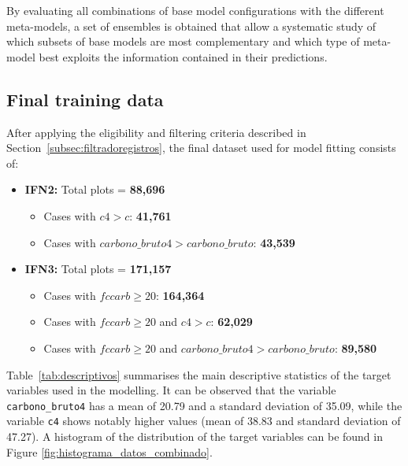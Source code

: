 By evaluating all combinations of base model configurations with the different meta-models, a set of ensembles is obtained that allow a systematic study of which subsets of base models are most complementary and which type of meta-model best exploits the information contained in their predictions.


\subsection{Final training data}
\label{subsec:datos_finales_entrenamiento}

After applying the eligibility and filtering criteria described in
Section~\ref{subsec:filtradoregistros}, the final dataset used
for model fitting consists of:

\begin{itemize}
    \item \textbf{IFN2:} Total plots = \textbf{88,696}
          \begin{itemize}
              \item Cases with $c4 > c$: \textbf{41,761}
              \item Cases with $carbono\_bruto4 > carbono\_bruto$: \textbf{43,539}
          \end{itemize}

    \item \textbf{IFN3:} Total plots = \textbf{171,157}
          \begin{itemize}
              \item Cases with $fccarb \geq 20$: \textbf{164,364}
              \item Cases with $fccarb \geq 20$ and $c4 > c$: \textbf{62,029}
              \item Cases with $fccarb \geq 20$ and $carbono\_bruto4 > carbono\_bruto$: \textbf{89,580}
          \end{itemize}
\end{itemize}

Table~\ref{tab:descriptivos} summarises the main descriptive statistics of the target variables used in the modelling.
It can be observed that the variable \texttt{carbono\_bruto4} has a mean of 20.79 and a standard deviation of 35.09, while the variable \texttt{c4} shows notably higher values (mean of 38.83 and standard deviation of 47.27). A histogram of the distribution of the target variables can be found in Figure \ref{fig:histograma_datos_combinado}.


